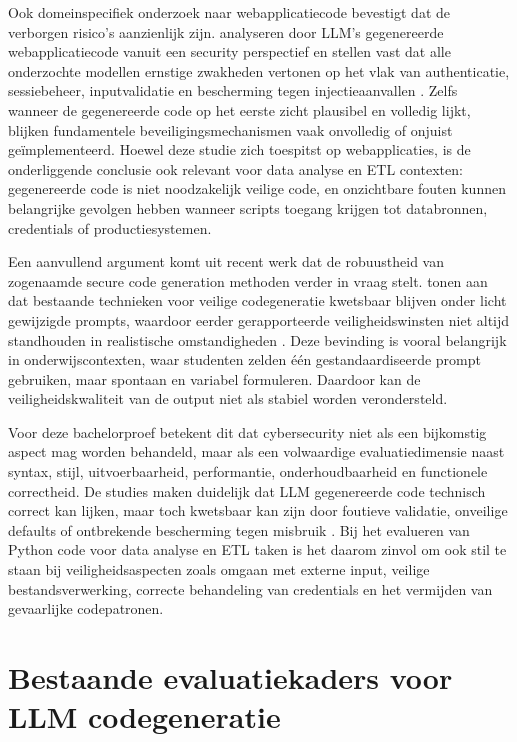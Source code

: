 Ook domeinspecifiek onderzoek naar webapplicatiecode bevestigt dat de verborgen risico's aanzienlijk zijn. \textcite{Dora2025} analyseren door LLM's gegenereerde webapplicatiecode vanuit een security perspectief en stellen vast dat alle onderzochte modellen ernstige zwakheden vertonen op het vlak van authenticatie, sessiebeheer, inputvalidatie en bescherming tegen injectieaanvallen \autocite{Dora2025}. Zelfs wanneer de gegenereerde code op het eerste zicht plausibel en volledig lijkt, blijken fundamentele beveiligingsmechanismen vaak onvolledig of onjuist geïmplementeerd. Hoewel deze studie zich toespitst op webapplicaties, is de onderliggende conclusie ook relevant voor data analyse en ETL contexten: gegenereerde code is niet noodzakelijk veilige code, en onzichtbare fouten kunnen belangrijke gevolgen hebben wanneer scripts toegang krijgen tot databronnen, credentials of productiesystemen.

Een aanvullend argument komt uit recent werk dat de robuustheid van zogenaamde secure code generation methoden verder in vraag stelt. \textcite{Shukla2025} tonen aan dat bestaande technieken voor veilige codegeneratie kwetsbaar blijven onder licht gewijzigde prompts, waardoor eerder gerapporteerde veiligheidswinsten niet altijd standhouden in realistische omstandigheden \autocite{Shukla2025}. Deze bevinding is vooral belangrijk in onderwijscontexten, waar studenten zelden één gestandaardiseerde prompt gebruiken, maar spontaan en variabel formuleren. Daardoor kan de veiligheidskwaliteit van de output niet als stabiel worden verondersteld.

Voor deze bachelorproef betekent dit dat cybersecurity niet als een bijkomstig aspect mag worden behandeld, maar als een volwaardige evaluatiedimensie naast syntax, stijl, uitvoerbaarheid, performantie, onderhoudbaarheid en functionele correctheid. De studies maken duidelijk dat LLM gegenereerde code technisch correct kan lijken, maar toch kwetsbaar kan zijn door foutieve validatie, onveilige defaults of ontbrekende bescherming tegen misbruik \autocite{Aldosari2026,Shukla2025}. Bij het evalueren van Python code voor data analyse en ETL taken is het daarom zinvol om ook stil te staan bij veiligheidsaspecten zoals omgaan met externe input, veilige bestandsverwerking, correcte behandeling van credentials en het vermijden van gevaarlijke codepatronen.


\section{Bestaande evaluatiekaders voor LLM codegeneratie}

